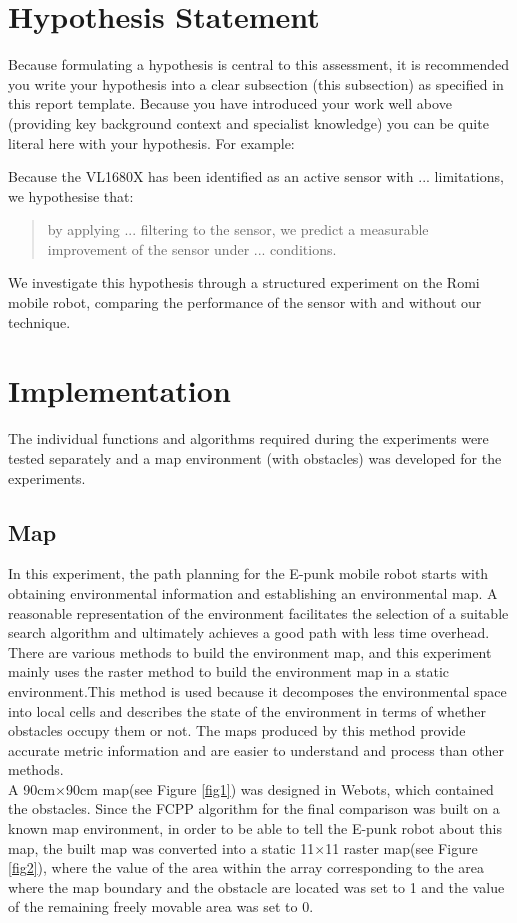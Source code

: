 \documentclass[conference]{IEEEtran}
\begin{document}
\section{Hypothesis Statement}

Because formulating a hypothesis is central to this assessment, it is recommended you write your hypothesis into a clear subsection (this subsection) as specified in this report template.  Because you have introduced your work well above (providing key background context and specialist knowledge) you can be quite literal here with your hypothesis.  For example: 

Because the VL1680X has been identified as an active sensor with ... limitations, we hypothesise that:
\begin{quote}
    by applying ... filtering to the sensor, we predict a measurable improvement of the sensor under ... conditions.  
\end{quote}

We investigate this hypothesis through a structured experiment on the Romi mobile robot, comparing the performance of the sensor with and without our technique.  

\section{Implementation}
The individual functions and algorithms required during the experiments were tested separately and a map environment (with obstacles) was developed for the experiments.
\subsection{Map}
In this experiment, the path planning for the E-punk mobile robot starts with obtaining environmental information and establishing an environmental map. A reasonable representation of the environment facilitates the selection of a suitable search algorithm and ultimately achieves a good path with less time overhead. There are various methods to build the environment map, and this experiment mainly uses the raster method\cite{moravec1985high} to build the environment map in a static environment.This method is used because it decomposes the environmental space into local cells and describes the state of the environment in terms of whether obstacles occupy them or not. The maps produced by this method provide accurate metric information and are easier to understand and process than other methods.\\
A 90cm$\times$90cm map(see Figure \ref{fig1}) was designed in Webots, which contained the obstacles. Since the FCPP algorithm for the final comparison was built on a known map environment, in order to be able to tell the E-punk robot about this map, the built map was converted into a static  11$\times$11 raster map(see Figure \ref{fig2}), where the value of the area within the array corresponding to the area where the map boundary and the obstacle are located was set to 1 and the value of the remaining freely movable area was set to 0.
\end{document}
